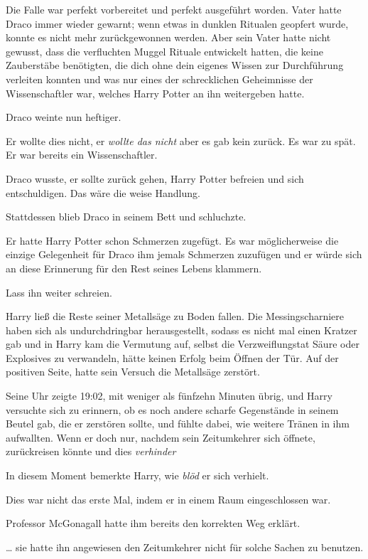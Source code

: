 {Die Falle war perfekt vorbereitet und perfekt ausgeführt worden. Vater hatte Draco immer wieder gewarnt; wenn etwas in dunklen Ritualen geopfert wurde, konnte es nicht mehr zurückgewonnen werden. Aber sein Vater hatte nicht gewusst, dass die verfluchten Muggel Rituale entwickelt hatten, die keine Zauberstäbe benötigten, die dich ohne dein eigenes Wissen zur Durchführung verleiten konnten und was nur eines der schrecklichen Geheimnisse der Wissenschaftler war, welches Harry Potter an ihn weitergeben hatte.

Draco weinte nun heftiger.

Er wollte dies nicht, er \emph{wollte das nicht} aber es gab kein zurück. Es war zu spät. Er war bereits ein Wissenschaftler.

Draco wusste, er sollte zurück gehen, Harry Potter befreien und sich entschuldigen. Das wäre die weise Handlung.

Stattdessen blieb Draco in seinem Bett und schluchzte.

Er hatte Harry Potter schon Schmerzen zugefügt. Es war möglicherweise die einzige Gelegenheit für Draco ihm jemals Schmerzen zuzufügen und er würde sich an diese Erinnerung für den Rest seines Lebens klammern.

Lass ihn weiter schreien.

Harry ließ die Reste seiner Metallsäge zu Boden fallen. Die Messingscharniere haben sich als undurchdringbar herausgestellt, sodass es nicht mal einen Kratzer gab und in Harry kam die Vermutung auf, selbst die Verzweiflungstat Säure oder Explosives zu verwandeln, hätte keinen Erfolg beim Öffnen der Tür. Auf der positiven Seite, hatte sein Versuch die Metallsäge zerstört.

Seine Uhr zeigte 19:02, mit weniger als fünfzehn Minuten übrig, und Harry versuchte sich zu erinnern, ob es noch andere scharfe Gegenstände in seinem Beutel gab, die er zerstören sollte, und fühlte dabei, wie weitere Tränen in ihm aufwallten. Wenn er doch nur, nachdem sein Zeitumkehrer sich öffnete, zurückreisen könnte und dies \emph{verhinder\later}

In diesem Moment bemerkte Harry, wie \emph{blöd} er sich verhielt.

Dies war nicht das erste Mal, indem er in einem Raum eingeschlossen war.

Professor McGonagall hatte ihm bereits den korrekten Weg erklärt.

… sie hatte ihn angewiesen den Zeitumkehrer nicht für solche Sachen zu benutzen.

}
